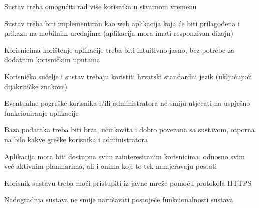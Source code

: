 		 
			 	\begin{packed_item}
			 	
			 	\item  $ $Sustav treba omogućiti rad više korisnika u stvarnom vremenu $ $
			 	\item  $ $Sustav treba biti implementiran kao web aplikacija koja će biti prilagođena i prikazu na mobilnim uređajima (aplikacija mora imati responzivan dizajn) $ $
			 	\item  $ $Korisnicima korištenje aplikacije treba biti intuitivno jasno, bez potrebe za dodatnim korisničkim uputama$ $
			 	\item  $ $Korisničko sučelje i sustav trebaju koristiti hrvatski standardni jezik (uključujući dijakritičke znakove)$ $
			 	\item  $ $Eventualne pogreške korisnika i/ili administratora ne smiju utjecati na uspješno funkcioniranje aplikacije$ $
			 	\item  $ $Baza podataka treba biti brza, učinkovita i dobro povezana sa sustavom, otporna na bilo kakve greške korisnika i administratora $ $
			 	
			 	\item  $ $Aplikacija mora biti dostupna svim zainteresiranim korisnicima, odnosno svim već aktivnim planinarima, ali i onima koji to tek namjeravaju postati$ $
			 	\item  $ $Korisnik sustavu treba moći pristupiti iz javne mreže pomoću protokola HTTPS $ $
			 	\item  $ $Nadogradnja sustava ne smije narušavati postojeće funkcionalnosti sustava$ $
			 	
			 
			 \end{packed_item}
			 
			 
			 
	